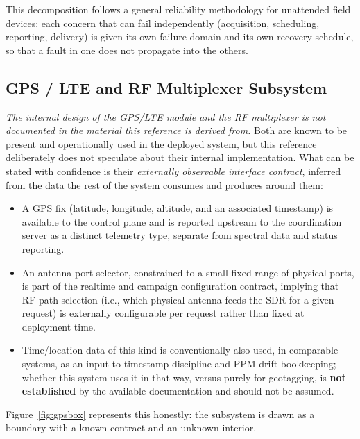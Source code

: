 \documentclass[11pt,a4paper]{article}
\newcommand{\undoc}[1]{\textcolor{gapbox}{\textit{#1}}}
\begin{document}
This decomposition follows a general reliability methodology for unattended field devices:
each concern that can fail independently (acquisition, scheduling, reporting, delivery) is
given its own failure domain and its own recovery schedule, so that a fault in one does not
propagate into the others.

\subsection{GPS / LTE and RF Multiplexer Subsystem}
\label{sec:gpslte}

\undoc{The internal design of the GPS/LTE module and the RF multiplexer is not documented in
the material this reference is derived from.} Both are known to be present and operationally
used in the deployed system, but this reference deliberately does not speculate about their
internal implementation. What can be stated with confidence is their \emph{externally
observable interface contract}, inferred from the data the rest of the system consumes and
produces around them:

\begin{itemize}[leftmargin=1.4em]
    \item A GPS fix (latitude, longitude, altitude, and an associated timestamp) is
    available to the control plane and is reported upstream to the coordination server as
    a distinct telemetry type, separate from spectral data and status reporting.
    \item An antenna-port selector, constrained to a small fixed range of physical ports,
    is part of the realtime and campaign configuration contract, implying that RF-path
    selection (i.e., which physical antenna feeds the SDR for a given request) is
    externally configurable per request rather than fixed at deployment time.
    \item Time/location data of this kind is conventionally also used, in comparable
    systems, as an input to timestamp discipline and PPM-drift bookkeeping; whether this
    system uses it in that way, versus purely for geotagging, is \textbf{not established}
    by the available documentation and should not be assumed.
\end{itemize}

Figure~\ref{fig:gpsbox} represents this honestly: the subsystem is drawn as a boundary with a
known contract and an unknown interior.
\end{document}
